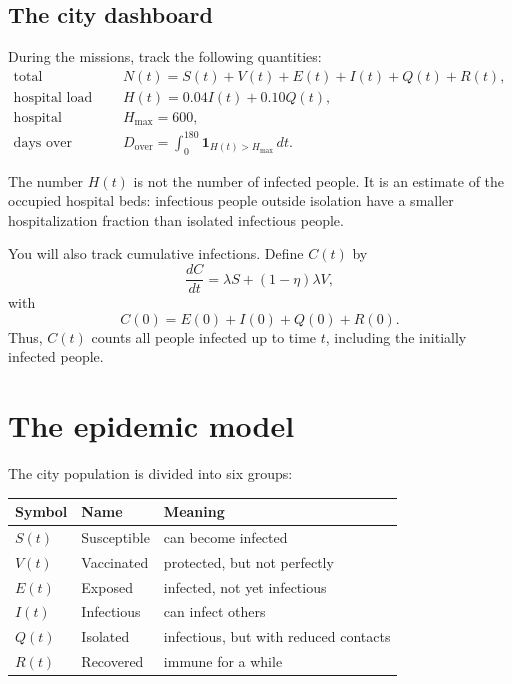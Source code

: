 \documentclass[11pt]{article}
\begin{document}
\subsection*{The city dashboard}

During the missions, track the following quantities:
\begin{align*}
    \text{total population} \quad &N(t)=S(t)+V(t)+E(t)+I(t)+Q(t)+R(t), \\
    \text{hospital load} \quad &H(t)=0.04 I(t)+0.10 Q(t), \\
    \text{hospital capacity} \quad &H_{\max}=600, \\
    \text{days over capacity} \quad &D_{\mathrm{over}}=\int_0^{180} \mathbf{1}_{H(t)>H_{\max}}\,dt.
\end{align*}

The number $H(t)$ is not the number of infected people. It is an estimate of the occupied hospital beds: infectious people outside isolation have a smaller hospitalization fraction than isolated infectious people.

You will also track cumulative infections. Define $C(t)$ by
\[
    \frac{dC}{dt}=\lambda S+(1-\eta)\lambda V,
\]
with
\[
    C(0)=E(0)+I(0)+Q(0)+R(0).
\]
Thus, $C(t)$ counts all people infected up to time $t$, including the initially infected people.

\newpage
\section*{The epidemic model}

The city population is divided into six groups:
\begin{center}
\begin{tabular}{lll}
\toprule
Symbol & Name & Meaning \\
\midrule
$S(t)$ & Susceptible & can become infected \\
$V(t)$ & Vaccinated & protected, but not perfectly \\
$E(t)$ & Exposed & infected, not yet infectious \\
$I(t)$ & Infectious & can infect others \\
$Q(t)$ & Isolated & infectious, but with reduced contacts \\
$R(t)$ & Recovered & immune for a while \\
\bottomrule
\end{tabular}
\end{center}
\end{document}
